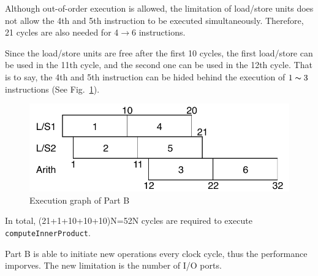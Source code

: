 \documentclass[english]{thesis}
\begin{document}
\begin{itemize}
Although out-of-order execution is allowed, the limitation of load/store units does not allow the 4th and 5th instruction to be executed simultaneously.
Therefore, 21 cycles are also needed for 4$\to$6 instructions.

Since the load/store units are free after the first 10 cycles, the first load/store can be used in the 11th cycle, and the second one can be used in the 12th cycle.
That is to say, the 4th and 5th instruction can be hided behind the execution of $1\thicksim 3$ instructions (See Fig.~\ref{fig:execution}).
\begin{figure}[H]
\centering
\includegraphics[width=0.6\linewidth]{parallel-execution.pdf}
\caption{Execution graph of Part B}
\label{fig:execution}
\end{figure}

In total, (21+1+10+10+10)N=52N cycles are required to execute \verb'computeInnerProduct'.

Part B is able to initiate new operations every clock cycle, thus the performance imporves.
The new limitation is the number of I/O ports.

\bigskip
\end{itemize}
\end{document}
